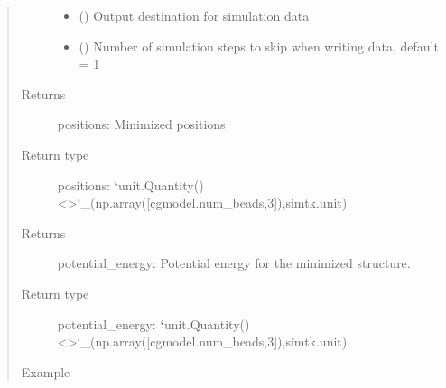 \documentclass[letterpaper,12pt,english,openany,oneside]{sphinxmanual}
\begin{document}
\begin{fulllineitems}
\begin{quote}
\begin{description}
\begin{itemize}
\item {} 
 () \textendash{} Output destination for simulation data

\item {} 
 () \textendash{} Number of simulation steps to skip when writing data, default = 1

\end{itemize}

\item[{Returns}] \leavevmode
positions: Minimized positions

\item[{Return type}] \leavevmode
positions: {\color{red}\bfseries{}{}`}unit.Quantity() \textless{}\textgreater{}{}`\_(np.array({[}cgmodel.num\_beads,3{]}),simtk.unit)

\item[{Returns}] \leavevmode
potential\_energy: Potential energy for the minimized structure.

\item[{Return type}] \leavevmode
potential\_energy: {\color{red}\bfseries{}{}`}unit.Quantity() \textless{}\textgreater{}{}`\_(np.array({[}cgmodel.num\_beads,3{]}),simtk.unit)

\item[{Example}] \leavevmode
\end{description}\end{quote}


\end{fulllineitems}
\end{document}
